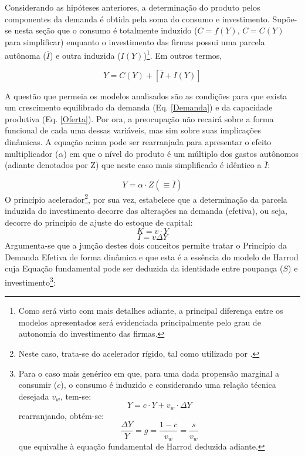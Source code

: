 Considerando as hipóteses anteriores, a determinação do produto pelos componentes da demanda é obtida pela soma do consumo e investimento. Supõe-se nesta seção que o consumo é totalmente induzido ($C = f(Y)$, $C = C(Y)$ para simplificar) enquanto o investimento das firmas possui uma parcela autônoma ($\overline I$) e outra induzida ($I(Y)$)\footnote{Como será visto com mais detalhes adiante, a principal diferença entre os modelos apresentados será evidenciada principalmente pelo grau de autonomia do investimento das firmas.}. Em outros termos,

\begin{equation}
\label{Demanda}
    Y = C(Y) + [\overline I + I(Y)]
\end{equation}

A questão que permeia os modelos analisados são as condições para que exista um crescimento equilibrado da demanda (Eq. \ref{Demanda}) e da capacidade produtiva (Eq. \ref{Oferta}). Por ora, a preocupação não recairá sobre a forma funcional de cada uma dessas variáveis, mas sim sobre suas implicações dinâmicas. A equação acima pode ser rearranjada para apresentar o efeito multiplicador ($\alpha$) em que o nível do produto é um múltiplo dos gastos autônomos (adiante denotados por Z) que neste caso mais simplificado é idêntico a $\overline I$:

\begin{equation}
    Y = \alpha\cdot Z (\equiv \overline I)
\end{equation}
O princípio acelerador\footnote{Neste caso, trata-se do acelerador rígido, tal como utilizado por \textcite{harrod_essay_1939}.}, por sua vez, estabelece que a determinação da parcela induzida do investimento decorre das alterações na demanda (efetiva), ou seja, decorre do princípio de ajuste do estoque de capital:
$$
K = v\cdot Y
$$
\begin{equation}
    I = v\Delta Y
\end{equation}
Argumenta-se que a junção destes dois conceitos permite tratar o Princípio da Demanda Efetiva de forma dinâmica e que esta é a essência do modelo de Harrod cuja Equação fundamental pode ser deduzida da identidade entre poupança ($S$) e investimento\footnote{Para o caso mais genérico em que, para uma dada propensão marginal a consumir ($c$), o consumo é induzido e considerando uma relação técnica desejada $v_w$, tem-se:
$$
Y = c\cdot Y + v_w\cdot \Delta Y
$$
rearranjando, obtém-se:
$$
\frac{\Delta Y}{Y} = g = \frac{1 - c}{v_w} = \frac{s}{v_w}
$$
que equivalhe à equação fundamental de Harrod deduzida adiante.
}:

